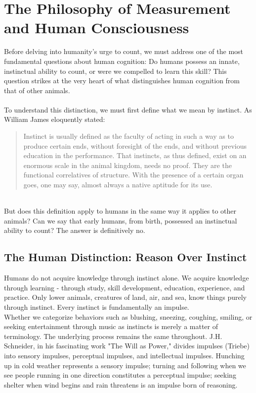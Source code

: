 \documentclass[12pt, oneside, openany]{book}
\begin{document}
\section{The Philosophy of Measurement and Human Consciousness}
Before delving into humanity's urge to count, we must address one of the most fundamental questions about human cognition: Do humans possess an innate, instinctual ability to count, or were we compelled to learn this skill? This question strikes at the very heart of what distinguishes human cognition from that of other animals.\\\\
To understand this distinction, we must first define what we mean by instinct. As William James eloquently stated:
\begin{quote}
	Instinct is usually defined as the faculty of acting in such a way as to produce certain ends, without foresight of the ends, and without previous education in the performance. That instincts, as thus defined, exist on an enormous scale in the animal kingdom, needs no proof. They are the functional correlatives of structure. With the presence of a certain organ goes, one may say, almost always a native aptitude for its use.
\end{quote}
\\
But does this definition apply to humans in the same way it applies to other animals? Can we say that early humans, from birth, possessed an instinctual ability to count? The answer is definitively no.

\subsection{The Human Distinction: Reason Over Instinct}

Humans do not acquire knowledge through instinct alone. We acquire knowledge through learning - through study, skill development, education, experience, and practice. Only lower animals, creatures of land, air, and sea, know things purely through instinct. Every instinct is fundamentally an impulse.\\
Whether we categorize behaviors such as blushing, sneezing, coughing, smiling, or seeking entertainment through music as instincts is merely a matter of terminology. The underlying process remains the same throughout. J.H. Schneider, in his fascinating work "The Will as Power," divides impulses (Triebe) into sensory impulses, perceptual impulses, and intellectual impulses. Hunching up in cold weather represents a sensory impulse; turning and following when we see people running in one direction constitutes a perceptual impulse; seeking shelter when wind begins and rain threatens is an impulse born of reasoning.
\end{document}
